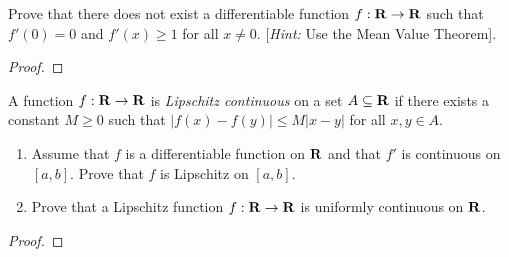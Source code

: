 \documentclass[11pt,twoside,openany]{memoir}
\begin{document}
\newpage
\fancyhead[L]{\scalebox{0.9}{Derivatives and the Mean Value Theorem}}
\fancyhead[R]{\scalebox{0.9}{Appeared on: F20}}
\begin{problem}
    Prove that there does not exist a differentiable function $f:\mathbf{R} \rightarrow \mathbf{R}$ such that $f'(0) = 0$ and $f'(x) \geq 1$ for all $x \neq 0$. [\textit{Hint:} Use the Mean Value Theorem].
\end{problem}
\begin{proof}
\end{proof}

\newpage
\fancyhead[L]{\scalebox{0.9}{Derivatives and the Mean Value Theorem}}
\fancyhead[R]{\scalebox{0.9}{Appeared on: S20}}
\begin{problem}
    A function $f:\mathbf{R} \rightarrow \mathbf{R}$ is \textit{Lipschitz continuous} on a set $A \subseteq \mathbf{R}$ if there exists a constant $M \geq 0$ such that $|f(x) - f(y)| \leq M|x-y|$ for all $x,y \in A$.
    \begin{enumerate}[label = (\arabic*)]
        \item Assume that $f$ is a differentiable function on $\mathbf{R}$ and that $f'$ is continuous on $[a,b]$. Prove that $f$ is Lipschitz on $[a,b]$.
        \item Prove that a Lipschitz function $f:\mathbf{R} \rightarrow \mathbf{R}$ is uniformly continuous on $\mathbf{R}$.
    \end{enumerate}
\end{problem}
\begin{proof}
\end{proof}
\end{document}
